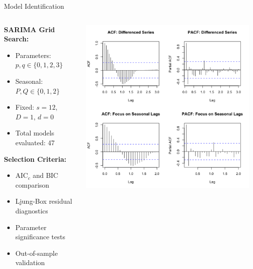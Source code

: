 \documentclass[10pt]{beamer}
\begin{document}
\begin{frame}{Model Identification}
\begin{columns}
\begin{column}{0.45\textwidth}
\textbf{SARIMA Grid Search:}
\begin{itemize}
\item Parameters: $p,q \in \{0,1,2,3\}$
\item Seasonal: $P,Q \in \{0,1,2\}$
\item Fixed: $s=12$, $D=1$, $d=0$
\item Total models evaluated: 47
\end{itemize}

\vspace{0.3cm}
\textbf{Selection Criteria:}
\begin{itemize}
\item AIC$_c$ and BIC comparison
\item Ljung-Box residual diagnostics
\item Parameter significance tests
\item Out-of-sample validation
\end{itemize}
\end{column}

\begin{column}{0.55\textwidth}
\includegraphics[width=\textwidth,height=0.85\textheight,keepaspectratio]{plots/model-identification.png}
\end{column}
\end{columns}
\end{frame}
\end{document}
